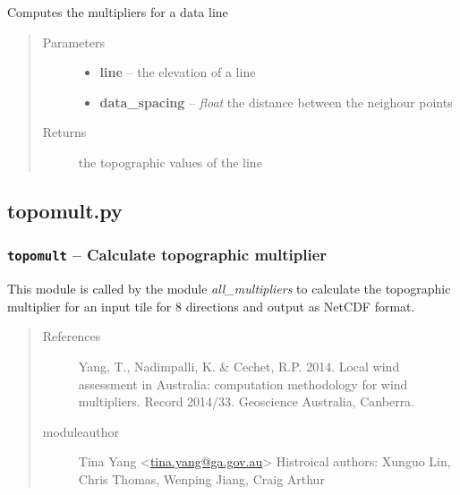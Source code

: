 \documentclass[letterpaper,10pt,english]{sphinxmanual}
\begin{document}
\begin{fulllineitems}
\label{docs/topographic:multiplier_calc.multiplier_calc}
Computes the multipliers for a data line
\begin{quote}\begin{description}
\item[{Parameters}] \leavevmode\begin{itemize}
\item {} 
\textbf{line} --  the elevation of a line

\item {} 
\textbf{data\_spacing} -- \emph{float} the distance between the neighour points

\end{itemize}

\item[{Returns}] \leavevmode
{} the topographic values of the line

\end{description}\end{quote}

\end{fulllineitems}



\subsection{topomult.py}
\label{docs/topographic:module-topomult}\label{docs/topographic:topomult-py}

\subsubsection{\texttt{topomult} -- Calculate topographic multiplier}
\label{docs/topographic:topomult-calculate-topographic-multiplier}
This module is called by the module
\emph{all\_multipliers} to calculate the topographic multiplier for an input
tile for 8 directions and output as NetCDF format.
\begin{quote}\begin{description}
\item[{References}] \leavevmode
Yang, T., Nadimpalli, K. \& Cechet, R.P. 2014. Local wind assessment
in Australia: computation methodology for wind multipliers. Record 2014/33.
Geoscience Australia, Canberra.

\item[{moduleauthor}] \leavevmode
Tina Yang \textless{}\href{mailto:tina.yang@ga.gov.au}{tina.yang@ga.gov.au}\textgreater{}
Histroical authors: Xunguo Lin, Chris Thomas, Wenping Jiang, Craig Arthur

\end{description}\end{quote}
\end{document}
